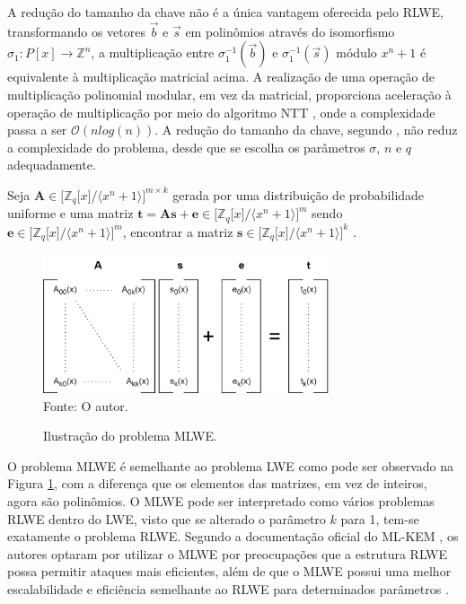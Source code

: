     A redução do tamanho da chave não é a única vantagem oferecida pelo \ac{RLWE}, transformando os vetores $\vec{b}$ e $\vec{s}$ em polinômios através do isomorfismo $\sigma_1:P[x] \to \mathbb{Z}^n$, a multiplicação entre $\sigma_{1}^{-1}(\vec{b})$ e $\sigma_{1}^{-1}(\vec{s})$ módulo $x^n + 1$ é equivalente à multiplicação matricial acima. A realização de uma operação de multiplicação polinomial modular, em vez da matricial, proporciona aceleração à operação de multiplicação por meio do algoritmo \ac{NTT} \cite{ntt}, onde a complexidade passa a ser $\mathcal{O}(n log(n))$. A redução do tamanho da chave, segundo \cite{ring_lwe}, não reduz a complexidade do problema, desde que se escolha os parâmetros $\sigma$, $n$ e $q$ adequadamente.
    
    \begin{definition}
        Seja $\textbf{A} \in {[}\mathbb{Z}_q{[}x{]} / \langle x^n+1 \rangle{]}^{m \times k}$ gerada por uma distribuição de probabilidade uniforme e uma matriz $\textbf{t} = \textbf{As} + \textbf{e} \in {[}\mathbb{Z}_q{[}x{]} / \langle x^n+1 \rangle{]}^{m}$ sendo $\textbf{e} \in {[}\mathbb{Z}_q{[}x{]} / \langle x^n+1 \rangle{]}^{m}$, encontrar a matriz $\textbf{s} \in {[}\mathbb{Z}_q{[}x{]} / \langle x^n+1 \rangle{]}^{k}$ \cite{module-lwe}. 
    \end{definition}

    \begin{figure}[htb!]
        \centering
        \caption{Ilustração do problema \ac{MLWE}.}
        \includegraphics[width=0.75\textwidth]{Figuras/kyber_keygen.png}\\
        \footnotesize{Fonte: O autor.}
        \label{fig:mlwe}
    \end{figure}

    O problema \ac{MLWE} é semelhante ao problema \ac{LWE} como pode ser observado na Figura \ref{fig:mlwe}, com a diferença que os elementos das matrizes, em vez de inteiros, agora são polinômios. O \ac{MLWE} pode ser interpretado como vários problemas \ac{RLWE} dentro do \ac{LWE}, visto que se alterado o parâmetro $k$ para 1, tem-se exatamente o problema \ac{RLWE}. Segundo a documentação oficial do \ac{ML-KEM} \cite{kyber}, os autores optaram por utilizar o \ac{MLWE} por preocupações que a estrutura \ac{RLWE} possa permitir ataques mais eficientes, além de que o \ac{MLWE} possui uma melhor escalabilidade e eficiência semelhante ao \ac{RLWE} para determinados parâmetros \cite{kyber2}.

